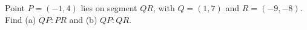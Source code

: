 Point $P=(-1,4)$ lies on segment $QR$, with $Q=(1,7)$ and $R=(-9,-8)$. Find (a) $QP:PR$ and (b) $QP:QR$.

